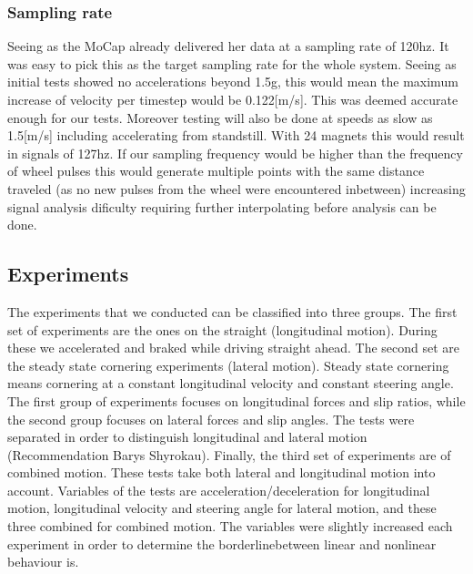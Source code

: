 \subsubsection{Sampling rate}
Seeing as the MoCap already delivered her data at a sampling rate of 120hz. It was easy to pick this as the target sampling rate for the whole system. Seeing as initial tests showed no accelerations beyond 1.5g, this would mean the maximum increase of velocity per timestep would be 0.122[m/s]. This was deemed accurate enough for our tests. Moreover testing will also be done at speeds as slow as 1.5[m/s] including accelerating from standstill. With 24 magnets this would result in signals of 127hz. If our sampling frequency would be higher than the frequency of wheel pulses this would generate multiple points with the same distance traveled (as no new pulses from the wheel were encountered inbetween) increasing signal analysis dificulty requiring further interpolating before analysis can be done.

\subsection{Experiments}
The experiments that we conducted can be classified into three groups. The first set of experiments are the ones on the straight (longitudinal motion). During these we accelerated and braked while driving straight ahead. The second set are the steady state cornering experiments (lateral motion). Steady state cornering means cornering at a constant longitudinal velocity and constant steering angle. The first group of experiments focuses on longitudinal forces and slip ratios, while the second group focuses on lateral forces and slip angles. The tests were separated in order to distinguish longitudinal and lateral motion (Recommendation Barys Shyrokau). Finally, the third set of experiments are of combined motion. These tests take both lateral and longitudinal motion into account. 
	Variables of the tests are acceleration/deceleration for longitudinal motion, longitudinal velocity and steering angle for lateral motion, and these three combined for  combined motion. The variables were slightly increased each experiment in order to determine the \textquotesingle borderline\textquotesingle  between linear and nonlinear behaviour is.

